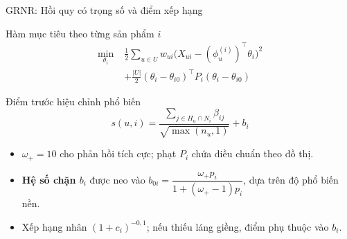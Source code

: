 \begin{frame}{GRNR: Hồi quy có trọng số và điểm xếp hạng}
\small
\begin{block}{Hàm mục tiêu theo từng sản phẩm $i$}
\vspace{0.13cm}
\[\begin{aligned}
\min_{\theta_i}\; &\frac12\sum_{u\in U}w_{ui}
\big(X_{ui}-(\phi_u^{(i)})^\top\theta_i\big)^2\\[-2pt]
&+\frac{|U|}{2}(\theta_i-\theta_{i0})^\top P_i(\theta_i-\theta_{i0})
\end{aligned}\]
\vspace{-0.17cm}
\end{block}
\vspace{0.04cm}
\begin{block}{Điểm trước hiệu chỉnh phổ biến}
\vspace{-0.15cm}
\[\boxed{\displaystyle s(u,i)=\frac{\sum_{j\in H_u\cap N_i}\beta_{ij}}{\sqrt{\max(n_u,1)}}+b_i}\]
\vspace{-0.18cm}
\end{block}
\vspace{0cm}
\begin{itemize}\setlength\itemsep{2pt}
\item $\omega_+=10$ cho phản hồi tích cực; phạt $P_i$ chứa điều chuẩn theo đồ thị.
\item \textbf{Hệ số chặn $b_i$} được neo vào $b_{0i}=\dfrac{\omega_+p_i}{1+(\omega_+-1)p_i}$, dựa trên độ phổ biến nền.
\item Xếp hạng nhân $(1+c_i)^{-0{,}1}$; nếu thiếu láng giềng, điểm phụ thuộc vào $b_i$.
\end{itemize}
\end{frame}

